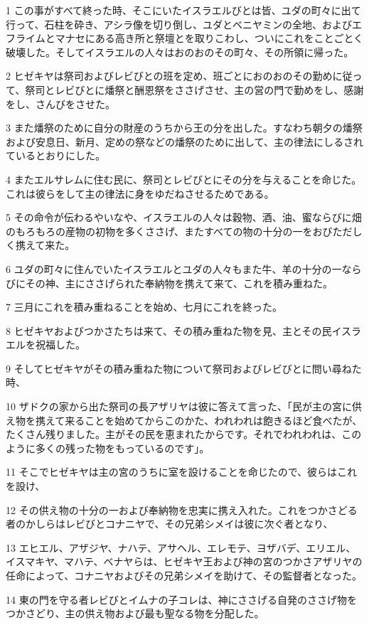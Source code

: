 \par 1 この事がすべて終った時、そこにいたイスラエルびとは皆、ユダの町々に出て行って、石柱を砕き、アシラ像を切り倒し、ユダとベニヤミンの全地、およびエフライムとマナセにある高き所と祭壇とを取りこわし、ついにこれをことごとく破壊した。そしてイスラエルの人々はおのおのその町々、その所領に帰った。
\par 2 ヒゼキヤは祭司およびレビびとの班を定め、班ごとにおのおのその勤めに従って、祭司とレビびとに燔祭と酬恩祭をささげさせ、主の営の門で勤めをし、感謝をし、さんびをさせた。
\par 3 また燔祭のために自分の財産のうちから王の分を出した。すなわち朝夕の燔祭および安息日、新月、定めの祭などの燔祭のために出して、主の律法にしるされているとおりにした。
\par 4 またエルサレムに住む民に、祭司とレビびとにその分を与えることを命じた。これは彼らをして主の律法に身をゆだねさせるためである。
\par 5 その命令が伝わるやいなや、イスラエルの人々は穀物、酒、油、蜜ならびに畑のもろもろの産物の初物を多くささげ、またすべての物の十分の一をおびただしく携えて来た。
\par 6 ユダの町々に住んでいたイスラエルとユダの人々もまた牛、羊の十分の一ならびにその神、主にささげられた奉納物を携えて来て、これを積み重ねた。
\par 7 三月にこれを積み重ねることを始め、七月にこれを終った。
\par 8 ヒゼキヤおよびつかさたちは来て、その積み重ねた物を見、主とその民イスラエルを祝福した。
\par 9 そしてヒゼキヤがその積み重ねた物について祭司およびレビびとに問い尋ねた時、
\par 10 ザドクの家から出た祭司の長アザリヤは彼に答えて言った、「民が主の宮に供え物を携えて来ることを始めてからこのかた、われわれは飽きるほど食べたが、たくさん残りました。主がその民を恵まれたからです。それでわれわれは、このように多くの残った物をもっているのです」。
\par 11 そこでヒゼキヤは主の宮のうちに室を設けることを命じたので、彼らはこれを設け、
\par 12 その供え物の十分の一および奉納物を忠実に携え入れた。これをつかさどる者のかしらはレビびとコナニヤで、その兄弟シメイは彼に次ぐ者となり、
\par 13 エヒエル、アザジヤ、ナハテ、アサヘル、エレモテ、ヨザバデ、エリエル、イスマキヤ、マハテ、ベナヤらは、ヒゼキヤ王および神の宮のつかさアザリヤの任命によって、コナニヤおよびその兄弟シメイを助けて、その監督者となった。
\par 14 東の門を守る者レビびとイムナの子コレは、神にささげる自発のささげ物をつかさどり、主の供え物および最も聖なる物を分配した。
